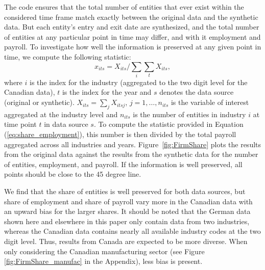 The \SynLBD{} code  ensures that the total number of entities that ever exist within the considered time frame  match exactly between the original data and the synthetic data. But  each entity's entry and exit date are synthesized, and the total number of entities at any particular point in time may differ, and with it employment and payroll. To investigate how well the information is preserved at any given point in time, we compute the following statistic:
\begin{equation}
    \label{eq:share_employment}
x_{its} = X_{its}/\sum_{i} \sum_{t} X_{its}, 
\end{equation}
where $i$ is the index for the industry (aggregated to the two digit level for the Canadian data), $t$ is the index for the year and $s$ denotes the data source (original or synthetic). $X_{its}=\sum_j X_{itsj}$, $j=1,\ldots,n_{its}$ is the variable of interest aggregated at the industry level and $n_{its}$ is the number of entities in industry $i$ at time point $t$ in data source $s$. 
To compute the statistic provided in Equation (\ref{eq:share_employment}), this number is then divided by the total payroll aggregated across all industries and years.
Figure~\ref{fig:FirmShare} plots the results from the original data against the results from the synthetic data for the  number of entities, employment, and {payroll}. If the information is well preserved, all points should be close to the 45 degree line. 



We find that the share of entities is well preserved for both data sources, but share of employment and share of payroll vary more in the Canadian data with an upward bias for the larger shares. 
It should be noted that the German data shown here and elsewhere in this paper only contain data from two industries, whereas the Canadian data contains nearly all  available industry codes at the two digit level. Thus, results from Canada are expected to be more diverse. 
When only considering the Canadian manufacturing sector (see Figure \ref{fig:FirmShare_manufac} in the Appendix), less bias is present.



